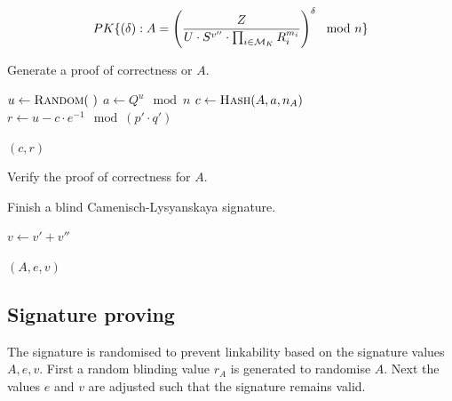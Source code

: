 \begin{equation*}
  PK\{(\delta) : A = \left(\dfrac{Z}{U \cdot S^{v''} \cdot \prod_{i \in \mathcal{M}_K} R_i^{m_i}} \right)^{\delta} \mod n \}
\end{equation*}

\begin{algorithm}
  \caption{Generate a proof of correctness or $A$.}
  \label{alg:CL-proof-A}
  \addtolength{\baselineskip}{1mm}
  \begin{algorithmic}[1]
      \State $u \gets \Call{Random}{~}$
      \State $a \gets Q^u \mod n$
      \State $c \gets \Call{Hash}{A, a, n_A}$
      \State $r \gets u - c \cdot e^{-1} \mod (p' \cdot q')$

      \Return $(c, r)$
    \EndFunction
  \end{algorithmic}
\end{algorithm}

\begin{algorithm}
  \caption{Verify the proof of correctness for $A$.}
  \label{alg:CL-verify-A}
  \addtolength{\baselineskip}{1mm}
  \begin{algorithmic}[1]
      \If{}
        \Return {}
      \EndIf

      \Return {}
    \EndFunction
  \end{algorithmic}
\end{algorithm}

\begin{algorithm}
  \caption{Finish a blind Camenisch-Lysyanskaya signature.}
  \label{alg:CL-blind-finish}
  \addtolength{\baselineskip}{1mm}
  \begin{algorithmic}[1]
      \State $v \gets v' + v''$

      \Return $(A, e, v)$
    \EndFunction
  \end{algorithmic}
\end{algorithm}

\subsection{Signature proving}\label{sec:cl_proof}

The signature is randomised to prevent linkability based on the signature values
$A, e, v$. First a random blinding value $r_A$ is generated to randomise $A$.
Next the values $e$ and $v$ are adjusted such that the signature remains valid.

